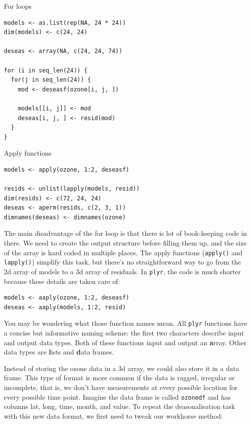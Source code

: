 \documentclass{scrartcl}
\newcommand{\code}[1]{\lstinline!#1!}
\newcommand{\f}[1]{\lstinline!#1()!}
\newcommand{\plyr}{{\tt plyr}\xspace}
\begin{document}
\raggedcolumns
\begin{multicols}{2}

\noindent For loops
\begin{verbatim}
models <- as.list(rep(NA, 24 * 24))
dim(models) <- c(24, 24)

deseas <- array(NA, c(24, 24, 74))

for (i in seq_len(24)) {
  for(j in seq_len(24)) {
    mod <- deseasf(ozone[i, j, ])

    models[[i, j]] <- mod
    deseas[i, j, ] <- resid(mod)
  }
}

\end{verbatim}
\columnbreak

\noindent Apply functions
\begin{verbatim}
models <- apply(ozone, 1:2, deseasf)

resids <- unlist(lapply(models, resid))
dim(resids) <- c(72, 24, 24)
deseas <- aperm(resids, c(2, 3, 1))
dimnames(deseas) <- dimnames(ozone)
\end{verbatim}
\end{multicols}

The main disadvantage of the for loop is that there is lot of book-keeping code in there.  We need to create the output structure before filling them up, and the size of the array is hard coded in multiple places.  The apply functions (\f{apply} and \f{lapply}) simplify this task, but there's no straightforward way to go from the 2d array of models to a 3d array of residuals. In \plyr, the code is much shorter because these details are taken care of:

\begin{verbatim}
models <- aaply(ozone, 1:2, deseasf)
deseas <- aaply(models, 1:2, resid)
\end{verbatim}

You may be wondering what those function names mean.  All \plyr functions have a concise but informative naming scheme: the first two characters describe input and output data types.  Both of these functions input and output an {\bf a}rray.  Other data types are {\bf l}ists and {\bf d}ata frames.

Instead of storing the ozone data in a 3d array, we could also store it in a data frame.  This type of format is more common if the data is ragged, irregular or incomplete, that is, we don't have measurements at every possible location for every possible time point.  Imagine the data frame is called \code{ozonedf} and has columns lat, long, time, month, and value.  To repeat the deasonalisation task with this new data format, we first need to tweak our workhorse method:
\end{document}
